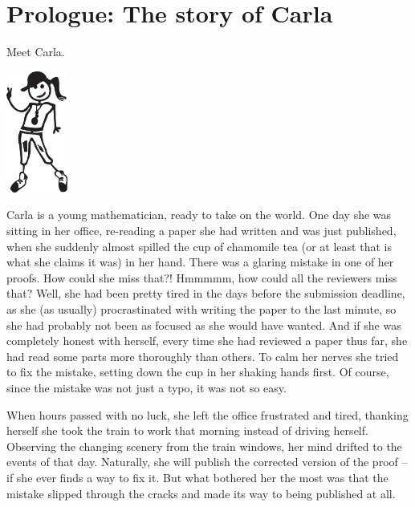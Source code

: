 \chapter{Prologue: The story of Carla}

Meet Carla.

\begin{center}
    \includegraphics[height=4cm]{img/carla.jpg}
\end{center}

Carla is a young mathematician, ready to take on the world. One day she was sitting in her office, re-reading a paper she had written and was just published, when she suddenly almost spilled the cup of chamomile tea (or at least that is what she claims it was) in her hand. There was a glaring mistake in one of her proofs. How could she miss that?! Hmmmmm, how could all the reviewers miss that? Well, she had been pretty tired in the days before the submission deadline, as she (as usually) procrastinated with writing the paper to the last minute, so she had probably not been as focused as she would have wanted. And if she was completely honest with herself, every time she had reviewed a paper thus far, she had read some parts more thoroughly than others. To calm her nerves she tried to fix the mistake, setting down the cup in her shaking hands first. Of course, since the mistake was not just a typo, it was not so easy.

When hours passed with no luck, she left the office frustrated and tired, thanking herself she took the train to work that morning instead of driving herself. Observing the changing scenery from the train windows, her mind drifted to the events of that day. Naturally, she will publish the corrected version of the proof -- if she ever finds a way to fix it. But what bothered her the most was that the mistake slipped through the cracks and made its way to being published at all.

